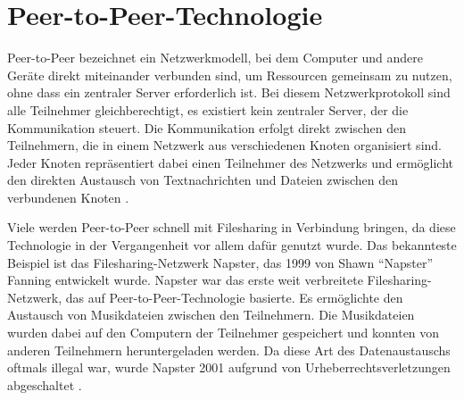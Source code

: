 \section{Peer-to-Peer-Technologie}
\label{subsec:peer_to_peer_technologie}


Peer-to-Peer bezeichnet ein Netzwerkmodell, bei dem Computer und andere Geräte direkt miteinander verbunden sind, um Ressourcen gemeinsam zu nutzen, ohne dass ein zentraler Server erforderlich ist. Bei diesem Netzwerkprotokoll sind alle Teilnehmer gleichberechtigt, es existiert kein zentraler Server, der die Kommunikation steuert. Die Kommunikation erfolgt direkt zwischen den Teilnehmern, die in einem Netzwerk aus verschiedenen Knoten organisiert sind. Jeder Knoten repräsentiert dabei einen Teilnehmer des Netzwerks und ermöglicht den direkten Austausch von Textnachrichten und Dateien zwischen den verbundenen Knoten \parencite[S. 6-8]{Mahlmann_P2PNetzwerke}.

Viele werden Peer-to-Peer schnell mit Filesharing in Verbindung bringen, da diese Technologie in der Vergangenheit vor allem dafür genutzt wurde. Das bekannteste Beispiel ist das Filesharing-Netzwerk Napster, das 1999 von Shawn \enquote{Napster} Fanning entwickelt wurde. Napster war das erste weit verbreitete Filesharing-Netzwerk, das auf Peer-to-Peer-Technologie basierte. Es ermöglichte den Austausch von Musikdateien zwischen den Teilnehmern. Die Musikdateien wurden dabei auf den Computern der Teilnehmer gespeichert und konnten von anderen Teilnehmern heruntergeladen werden. Da diese Art des Datenaustauschs oftmals illegal war, wurde Napster 2001 aufgrund von Urheberrechtsverletzungen abgeschaltet \parencite[S. 4-6]{Mahlmann_P2PNetzwerke}.


